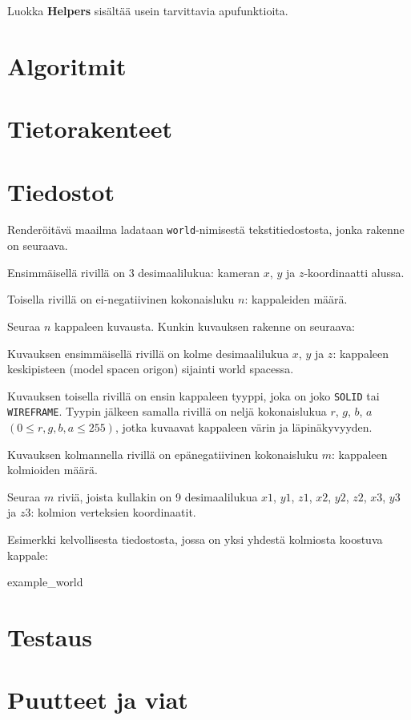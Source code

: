\documentclass[12pt] {article}
\begin{document}
Luokka \textbf{Helpers} sisältää usein tarvittavia apufunktioita.

\section {Algoritmit}

\section {Tietorakenteet}

\section {Tiedostot}

Renderöitävä maailma ladataan \texttt{world}-nimisestä tekstitiedostosta, jonka rakenne on seuraava.

Ensimmäisellä rivillä on 3 desimaalilukua: kameran $x$, $y$ ja $z$-koordinaatti alussa.

Toisella rivillä on ei-negatiivinen kokonaisluku $n$: kappaleiden määrä.

Seuraa $n$ kappaleen kuvausta. Kunkin kuvauksen rakenne on seuraava:

Kuvauksen ensimmäisellä rivillä on kolme desimaalilukua $x$, $y$ ja $z$: kappaleen keskipisteen (model spacen origon) sijainti world spacessa.

Kuvauksen toisella rivillä on ensin kappaleen tyyppi, joka on joko \texttt{SOLID} tai \texttt{WIREFRAME}. Tyypin jälkeen samalla rivillä on neljä kokonaislukua $r$, $g$, $b$, $a$ $(0 \leq r, g, b, a \leq 255)$, jotka kuvaavat kappaleen värin ja läpinäkyvyyden.

Kuvauksen kolmannella rivillä on epänegatiivinen kokonaisluku $m$: kappaleen kolmioiden määrä.

Seuraa $m$ riviä, joista kullakin on 9 desimaalilukua $x1$, $y1$, $z1$, $x2$, $y2$, $z2$, $x3$, $y3$ ja $z3$: kolmion verteksien koordinaatit.

Esimerkki kelvollisesta tiedostosta, jossa on yksi yhdestä kolmiosta koostuva kappale:

 {example_world}

\section {Testaus}

\section {Puutteet ja viat}
\end{document}
